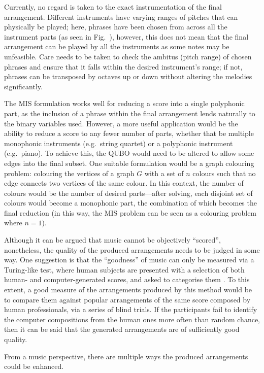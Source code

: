 \documentclass[12pt]{article}
\theoremstyle{definition}
\begin{document}
Currently, no regard is taken to the exact instrumentation of the final arrangement. Different instruments have varying ranges of pitches that can physically be played; here, phrases have been chosen from across all the instrument parts (as seen in Fig.\  ), however, this does not mean that the final arrangement can be played by all the instruments as some notes may be unfeasible. Care needs to be taken to check the ambitus (pitch range) of chosen phrases and ensure that it falls within the desired instrument's range; if not, phrases can be transposed by octaves up or down without altering the melodies significantly.

The MIS formulation works well for reducing a score into a single polyphonic part, as the inclusion of a phrase within the final arrangement lends naturally to the binary variables used. However, a more useful application would be the ability to reduce a score to any fewer number of parts, whether that be multiple monophonic instruments (e.g.\ string quartet) or a polyphonic instrument (e.g.\ piano). To achieve this, the QUBO would need to be altered to allow some edges into the final subset. One suitable formulation would be a graph colouring problem: colouring the vertices of a graph $G$ with a set of $n$ colours such that no edge connects two vertices of the same colour. In this context, the number of colours would be the number of desired parts—after solving, each disjoint set of colours would become a monophonic part, the combination of which becomes the final reduction (in this way, the MIS problem can be seen as a colouring problem where $n=1$).

Although it can be argued that music cannot be objectively ``scored'', nonetheless, the quality of the produced arrangements needs to be judged in some way. One suggestion is that the ``goodness'' of music can only be measured via a Turing-like test, where human subjects are presented with a selection of both human- and computer-generated scores, and asked to categorise them . To this extent, a good measure of the arrangements produced by this method would be to compare them against popular arrangements of the same score composed by human professionals, via a series of blind trials. If the participants fail to identify the computer compositions from the human ones more often than random chance, then it can be said that the generated arrangements are of sufficiently good quality.

From a music perspective, there are multiple ways the produced arrangements could be enhanced.
\end{document}
